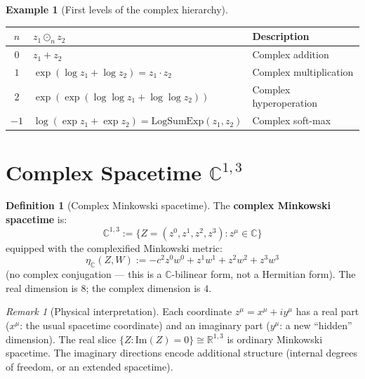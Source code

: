 \documentclass[12pt]{article}
\theoremstyle{plain}
\theoremstyle{definition}
\newtheorem{definition}[theorem]{Definition}
\newtheorem{example}[theorem]{Example}
\theoremstyle{remark}
\newtheorem{remark}[theorem]{Remark}
\newcommand{\CC}{\mathbb{C}}
\newcommand{\RR}{\mathbb{R}}
\begin{document}
\begin{example}[First levels of the complex hierarchy]\label{ex:complex-levels}
\begin{center}\small
\begin{tabular}{cll}\toprule
$n$ & $z_1 \odot_n z_2$ & \textbf{Description} \\\midrule
$0$ & $z_1 + z_2$ & Complex addition \\
$1$ & $\exp(\log z_1 + \log z_2) = z_1 \cdot z_2$ & Complex multiplication \\
$2$ & $\exp(\exp(\log\log z_1 + \log\log z_2))$ & Complex hyperoperation \\
$-1$ & $\log(\exp z_1 + \exp z_2) = \mathrm{LogSumExp}(z_1, z_2)$ & Complex soft-max \\
\bottomrule
\end{tabular}
\end{center}
\end{example}


\section{Complex Spacetime $\CC^{1,3}$}
\label{sec:complex-spacetime}

\begin{definition}[Complex Minkowski spacetime]\label{def:complex-mink}
The \textbf{complex Minkowski spacetime} is:
\begin{equation}
\CC^{1,3} := \{Z = (z^0, z^1, z^2, z^3) : z^\mu \in \CC\}
\end{equation}
equipped with the complexified Minkowski metric:
\begin{equation}
\eta_\CC(Z, W) := -c^2 z^0 w^0 + z^1 w^1 + z^2 w^2 + z^3 w^3
\end{equation}
(no complex conjugation --- this is a $\CC$-bilinear form, not a Hermitian form). The real dimension is $8$; the complex dimension is $4$.
\end{definition}

\begin{remark}[Physical interpretation]
Each coordinate $z^\mu = x^\mu + iy^\mu$ has a real part ($x^\mu$: the usual spacetime coordinate) and an imaginary part ($y^\mu$: a new ``hidden'' dimension). The real slice $\{Z : \mathrm{Im}(Z) = 0\} \cong \RR^{1,3}$ is ordinary Minkowski spacetime. The imaginary directions encode additional structure (internal degrees of freedom, or an extended spacetime).
\end{remark}
\end{document}
